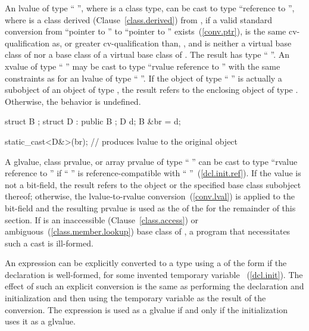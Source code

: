 \pnum
{}%
%
An lvalue of type `` '', where  is a class
type, can be cast to type ``reference to  '', where
 is a class derived (Clause~\ref{class.derived}) from
, if a valid standard conversion from ``pointer to ''
to ``pointer to '' exists~(\ref{conv.ptr}),  is the
same cv-qualification as, or greater cv-qualification than,
, and  is neither a virtual base class of 
nor a base class of a virtual base class of . The result has
type `` ''. An xvalue of type
`` '' may be cast to type ``rvalue reference to
 '' with the same constraints as for an lvalue of
type `` ''. If the object
of type `` '' is actually a subobject of an object
of type , the result refers to the enclosing object of type
. Otherwise, the behavior is undefined.
\enterexample 

\begin{codeblock}
struct B { };
struct D : public B { };
D d;
B &br = d;

static_cast<D&>(br);            // produces lvalue to the original  object
\end{codeblock}
\exitexample 

\pnum
A glvalue, class prvalue, or array prvalue
of type `` '' can be cast to type ``rvalue
reference to  '' if `` '' is
reference-compatible with ``
''~(\ref{dcl.init.ref}). If the value is not a bit-field,
the result refers to the object or the specified base class subobject
thereof; otherwise, the lvalue-to-rvalue conversion~(\ref{conv.lval})
is applied to the bit-field and the resulting prvalue is used as the
 of the  for the remainder of this section.
If  is an inaccessible (Clause~\ref{class.access}) or
ambiguous~(\ref{class.member.lookup}) base class of ,
a program that necessitates such a cast is ill-formed.

\pnum
An expression  can be explicitly converted to a type
 using a  of the form
 if the declaration  is
well-formed, for some invented temporary variable
~(\ref{dcl.init}). The effect of such an explicit conversion is
the same as performing the declaration and initialization and then using
the temporary variable as the result of the conversion. The expression
 is used as a glvalue if and
only if the initialization uses it as a glvalue.

